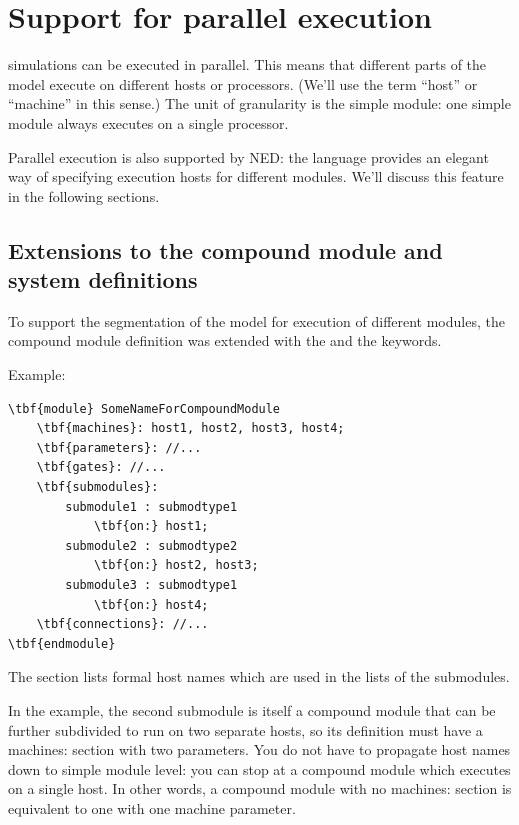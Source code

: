 \section{Support for parallel execution}

\opp simulations can be executed in parallel. This means that different parts of the model execute on
different hosts or processors.  (We'll use the term ``host'' or
``machine'' in this sense.) The unit of granularity is the
simple module: one simple
module always executes on a single processor.


Parallel execution is also supported by NED: the language provides
an elegant way of specifying execution hosts for different modules.
We'll discuss this feature in the following sections.





\subsection{Extensions to the compound module and system definitions}

To support the segmentation of the model for
execution of different modules, the compound module definition was
extended with the  and the  keywords.

Example:
\begin{Verbatim}[commandchars=\\\{\}]
\tbf{module} SomeNameForCompoundModule
    \tbf{machines}: host1, host2, host3, host4;
    \tbf{parameters}: //...
    \tbf{gates}: //...
    \tbf{submodules}:
        submodule1 : submodtype1
            \tbf{on:} host1;
        submodule2 : submodtype2
            \tbf{on:} host2, host3;
        submodule3 : submodtype1
            \tbf{on:} host4;
    \tbf{connections}: //...
\tbf{endmodule}
\end{Verbatim}


The  section lists formal host
names which are used in the  lists of the
submodules.


In the example, the second submodule is itself a compound module that
can be further subdivided to run on two separate hosts, so its
definition must have a machines: section with two parameters.  You do
not have to propagate host names down to simple module level: you can
stop at a compound module which executes on a single host. In other
words, a compound module with no machines: section is equivalent to
one with one machine parameter.

